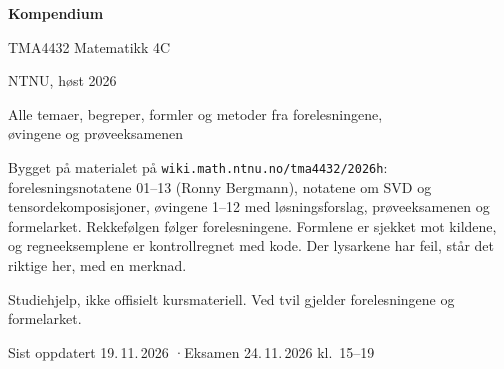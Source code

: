 \documentclass[11pt,a4paper]{article}
\begin{document}
\begin{titlepage}
\centering
\vspace*{3cm}
{\sffamily\Huge\bfseries\color{blaa} Kompendium\par}
\vspace{0.6cm}
{\sffamily\LARGE TMA4432 Matematikk 4C\par}
\vspace{0.3cm}
{\sffamily\large NTNU, høst 2026\par}
\vspace{1.2cm}
{\large Alle temaer, begreper, formler og metoder fra forelesningene,\\ øvingene og prøveeksamenen\par}
\vspace{2cm}
\begin{minipage}{0.82\textwidth}
\small
Bygget på materialet på \texttt{wiki.math.ntnu.no/tma4432/2026h}: forelesningsnotatene 01--13 (Ronny Bergmann), notatene om SVD og tensordekomposisjoner, øvingene 1--12 med løsningsforslag, prøveeksamenen og formelarket. Rekkefølgen følger forelesningene. Formlene er sjekket mot kildene, og regneeksemplene er kontrollregnet med kode. Der lysarkene har feil, står det riktige her, med en merknad.

\medskip
Studiehjelp, ikke offisielt kursmateriell. Ved tvil gjelder forelesningene og formelarket.
\end{minipage}
\vfill
{\small Sist oppdatert 19.\,11.\,2026 \quad·\quad Eksamen 24.\,11.\,2026 kl.\ 15--19\par}
\end{titlepage}

\tableofcontents
\clearpage















\end{document}

